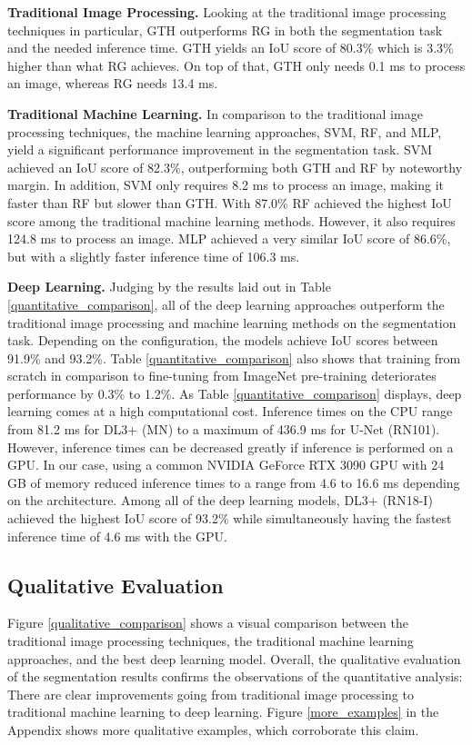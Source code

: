 \documentclass{isprs} %
\begin{document}
\textbf{Traditional Image Processing.} Looking at the traditional image processing techniques in particular, GTH outperforms RG in both the segmentation task and the needed inference time. GTH yields an IoU score of 80.3\% which is 3.3\% higher than what RG achieves. On top of that, GTH only needs 0.1 ms to process an image, whereas RG needs 13.4 ms.  

\textbf{Traditional Machine Learning.} In comparison to the traditional image processing techniques, the machine learning approaches, SVM, RF, and MLP, yield a significant performance improvement in the segmentation task. SVM achieved an IoU score of 82.3\%, outperforming both GTH and RF by noteworthy margin. In addition, SVM only requires 8.2 ms to process an image, making it faster than RF but slower than GTH. With 87.0\% RF achieved the highest IoU score among the traditional machine learning methods. However, it also requires 124.8 ms to process an image. MLP achieved a very similar IoU score of 86.6\%, but with a slightly faster inference time of 106.3 ms.   

\textbf{Deep Learning.} 
Judging by the results laid out in Table \ref{quantitative_comparison}, all of the deep learning approaches outperform the traditional image processing and machine learning methods on the segmentation task. Depending on the configuration, the models achieve IoU scores between 91.9\% and 93.2\%. Table \ref{quantitative_comparison} also shows that training from scratch in comparison to fine-tuning from ImageNet pre-training deteriorates performance by 0.3\% to 1.2\%. As Table \ref{quantitative_comparison} displays, deep learning comes at a high computational cost. Inference times on the CPU range from 81.2 ms for DL3+ (MN) to a maximum of 436.9 ms for U-Net (RN101). However, inference times can be decreased greatly if inference is performed on a GPU. In our case, using a common NVIDIA GeForce RTX 3090 GPU with 24 GB of memory reduced inference times to a range from 4.6 to 16.6 ms depending on the architecture. Among all of the deep learning models, DL3+ (RN18-I) achieved the highest IoU score of 93.2\% while simultaneously having the fastest inference time of 4.6 ms with the GPU.

\subsection{Qualitative Evaluation}
Figure \ref{qualitative_comparison} shows a visual comparison between the traditional image processing techniques, the traditional machine learning approaches, and the best deep learning model. Overall, the qualitative evaluation of the segmentation results confirms the observations of the quantitative analysis: There are clear improvements going from traditional image processing to traditional machine learning to deep learning. Figure \ref{more_examples} in the Appendix shows more qualitative examples, which corroborate this claim. 
\end{document}
